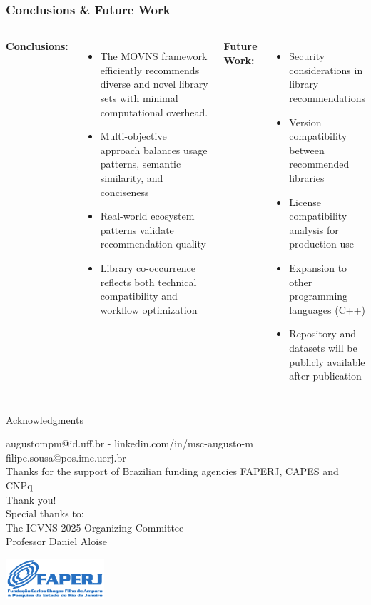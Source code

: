 \documentclass{beamer}
\begin{document}
\begin{frame}
\frametitle{Conclusions \& Future Work}

\begin{columns}[T]
\textbf{Conclusions:}
\begin{itemize}
\item The MOVNS framework efficiently recommends diverse and novel library sets with minimal computational overhead.
\item Multi-objective approach balances usage patterns, semantic similarity, and conciseness
\item Real-world ecosystem patterns validate recommendation quality
\item Library co-occurrence reflects both technical compatibility and workflow optimization
\end{itemize}

\textbf{Future Work:}
\begin{itemize}
\item Security considerations in library recommendations
\item Version compatibility between recommended libraries
\item License compatibility analysis for production use
\item Expansion to other programming languages (C++)
\item Repository and datasets will be publicly available after publication
\end{itemize}
\end{columns}

\end{frame}

\begin{frame}{Acknowledgments}
    \begin{center}
        \large
        {augustompm@id.uff.br - linkedin.com/in/msc-augusto-m}\\[0.2cm]
        {filipe.sousa@pos.ime.uerj.br}\\[0.2cm]
        \small Thanks for the support of Brazilian funding agencies FAPERJ, CAPES and CNPq\\
        \Huge{Thank you!}\\[1cm]
        \large
        Special thanks to:\\
        The ICVNS-2025 Organizing Committee\\
        Professor Daniel Aloise %


        \includegraphics[height=1.5cm]{faperj.png}
    \end{center}
\end{frame}
\end{document}
